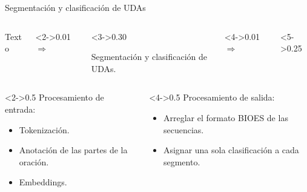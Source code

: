 \documentclass{beamer}
\begin{document}
\begin{frame}{Segmentación y clasificación de UDAs}
    \begin{columns}
        \begin{column}{0.10\textwidth}
            \begin{block}{}
                Texto
            \end{block}
        \end{column}
        \begin{column}<2->{0.01\textwidth}
            \begin{math}
                \Rightarrow
            \end{math}
        \end{column}
        \begin{column}<3->{0.30\textwidth}
            \begin{block}{}
                Segmentación y clasificación de UDAs.
            \end{block}
        \end{column}
        \begin{column}<4->{0.01\textwidth}
            \begin{math}
                \Rightarrow
            \end{math}
        \end{column}
        \begin{column}<5->{0.25\textwidth}
            
        \end{column}
    \end{columns}

    \vspace{1cm}

    \begin{columns}[T]
        \begin{column}<2->{0.5\textwidth}
            Procesamiento de entrada:
            \begin{itemize}
                \item Tokenización.
                \item Anotación de las partes de la oración.
                \item Embeddings.
            \end{itemize}
        \end{column}
        \begin{column}<4->{0.5\textwidth}
            Procesamiento de salida:
            \begin{itemize}
                \item Arreglar el formato BIOES de las secuencias.
                \item Asignar una sola clasificación a cada segmento.
            \end{itemize}
        \end{column}
    \end{columns}
\end{frame}
\end{document}

